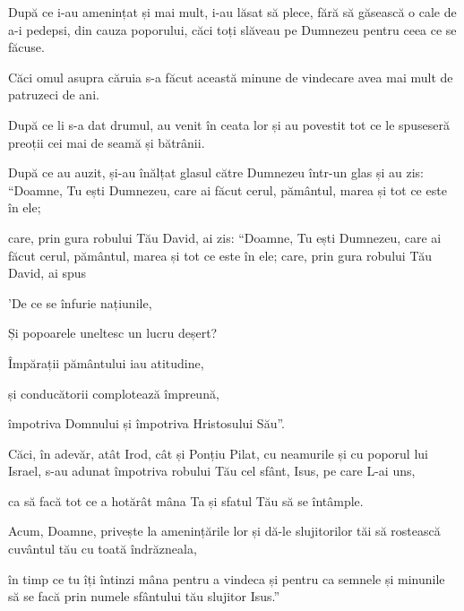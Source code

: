{\par }{\PP {}După ce i-au amenințat și mai mult, i-au lăsat să plece, fără să găsească o cale de a-i pedepsi, din cauza poporului, căci toți slăveau pe Dumnezeu pentru ceea ce se făcuse.

Căci omul asupra căruia s-a făcut această minune de vindecare avea mai mult de patruzeci de ani.


\par }{\PP {}După ce li s-a dat drumul, au venit în ceata lor și au povestit tot ce le spuseseră preoții cei mai de seamă și bătrânii.

După ce au auzit, și-au înălțat glasul către Dumnezeu într-un glas și au zis: “Doamne, Tu ești Dumnezeu, care ai făcut cerul, pământul, marea și tot ce este în ele;

care, prin gura robului Tău David, ai zis: “Doamne, Tu ești Dumnezeu, care ai făcut cerul, pământul, marea și tot ce este în ele; care, prin gura robului Tău David, ai spus

\par }{\Q 'De ce se înfurie națiunile,

\par }{\QB Și popoarele uneltesc un lucru deșert?


\par }{\Q {}Împărații pământului iau atitudine,

\par }{\QB și conducătorii complotează împreună,

\par }{\QB împotriva Domnului și împotriva Hristosului Său”.


\par }{\PP {}Căci, în adevăr,
atât Irod, cât și Ponțiu Pilat, cu neamurile și cu poporul lui Israel, s-au adunat împotriva robului Tău cel sfânt, Isus, pe care L-ai uns,

ca să facă tot ce a hotărât mâna Ta și sfatul Tău să se întâmple.

Acum, Doamne, privește la amenințările lor și dă-le slujitorilor tăi să rostească cuvântul tău cu toată îndrăzneala,

în timp ce tu îți întinzi mâna pentru a vindeca și pentru ca semnele și minunile să se facă prin numele sfântului tău slujitor Isus.”


}
